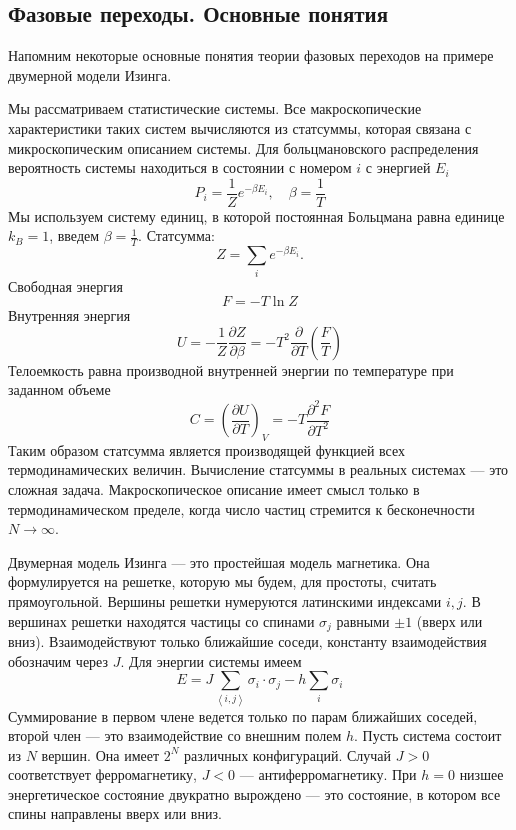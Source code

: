 \documentclass[a4paper,12pt]{article}
\theoremstyle{definition}
\theoremstyle{definition}
\theoremstyle{definition}
\begin{document}
\subsection{Фазовые переходы. Основные понятия}
\label{sec:phase-transitions}

Напомним некоторые основные понятия теории фазовых переходов на примере двумерной модели Изинга.

Мы рассматриваем статистические системы. Все макроскопические характеристики таких систем вычисляются из статсуммы, которая связана с микроскопическим описанием системы. Для больцмановского распределения вероятность системы находиться в состоянии с номером $i$ с энергией $E_i$
\begin{equation}
  \label{eq:2}
  P_i=\frac{1}{Z}e^{-\beta E_i}, \quad \beta=\frac{1}{T}
\end{equation}
Мы используем систему единиц, в которой постоянная Больцмана равна единице $k_B=1$, введем $\beta=\frac{1}{T}$. Статсумма:
\begin{equation}
  \label{eq:3}
  Z=\sum_i e^{-\beta E_i}.
\end{equation}
Свободная энергия
\begin{equation}
  \label{eq:4}
  F=-T\ln Z
\end{equation}
Внутренняя энергия
\begin{equation}
  \label{eq:5}
  U=-\frac{1}{Z}\frac{\partial Z}{\partial \beta}=-T^2 \frac{\partial}{\partial T}\left(\frac{F}{T}\right)
\end{equation}
Телоемкость равна производной внутренней энергии по температуре при заданном объеме
\begin{equation}
  \label{eq:6}
  C=\left(\frac{\partial U}{\partial T}\right)_V=-T\frac{\partial^2 F}{\partial T^2}
\end{equation}
Таким образом статсумма является производящей функцией всех термодинамических величин. Вычисление статсуммы в реальных системах --- это сложная задача.
Макроскопическое описание имеет смысл только в термодинамическом пределе, когда число частиц стремится к бесконечности $N\to \infty$.

Двумерная модель Изинга --- это простейшая модель магнетика. Она формулируется на решетке, которую мы будем, для простоты, считать прямоугольной. Вершины решетки нумеруются латинскими индексами $i,j$. В вершинах решетки находятся частицы со спинами $\sigma_j$ равными $\pm 1$ (вверх или вниз). Взаимодействуют только ближайшие соседи, константу взаимодействия обозначим через $J$. Для энергии системы имеем
\begin{equation}
  \label{eq:1}
  E=J\sum_{\left<i,j\right>} \sigma_i\cdot \sigma_j-h\sum_i \sigma_i
\end{equation}
Суммирование в первом члене ведется только по парам ближайших соседей, второй член --- это взаимодействие со внешним полем $h$.
Пусть система состоит из $N$ вершин. Она имеет $2^N$ различных конфигураций. Случай $J>0$ соответствует ферромагнетику, $J<0$ --- антиферромагнетику. 
При $h=0$ низшее энергетическое состояние двукратно вырождено --- это состояние, в котором все спины направлены вверх или вниз. 
\end{document}
